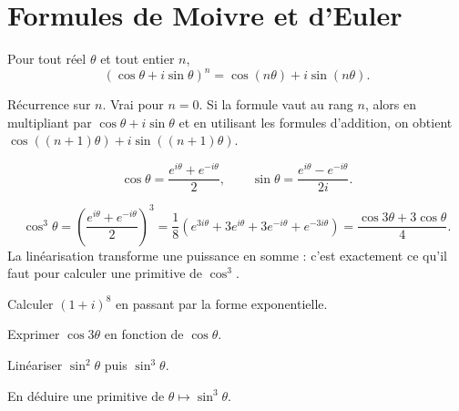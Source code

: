 \section{Formules de Moivre et d'Euler}

\begin{theoreme}
Pour tout réel $\theta$ et tout entier $n$,
\[
  \left(\cos\theta+i\sin\theta\right)^{n} = \cos(n\theta)+i\sin(n\theta).
\]
\end{theoreme}

\begin{demonstration}
Récurrence sur $n$. Vrai pour $n = 0$. Si la formule vaut au rang $n$, alors
en multipliant par $\cos\theta+i\sin\theta$ et en utilisant les formules
d'addition, on obtient $\cos((n+1)\theta)+i\sin((n+1)\theta)$.
\end{demonstration}

\begin{theoreme}
\[
  \cos\theta = \frac{e^{i\theta}+e^{-i\theta}}{2},
  \qquad
  \sin\theta = \frac{e^{i\theta}-e^{-i\theta}}{2i}.
\]
\end{theoreme}

\begin{exemple}
\[
  \cos^{3}\theta
  = \left(\frac{e^{i\theta}+e^{-i\theta}}{2}\right)^{3}
  = \frac18\left(e^{3i\theta}+3e^{i\theta}+3e^{-i\theta}+e^{-3i\theta}\right)
  = \frac{\cos3\theta+3\cos\theta}{4}.
\]
La linéarisation transforme une puissance en somme : c'est exactement ce
qu'il faut pour calculer une primitive de $\cos^{3}$.
\end{exemple}

\begin{entrainement}
\exo[\niveau{1}] Calculer $(1+i)^{8}$ en passant par la forme exponentielle.

\exo[\niveau{2}] Exprimer $\cos3\theta$ en fonction de $\cos\theta$.

\exo[\niveau{2}] Linéariser $\sin^{2}\theta$ puis $\sin^{3}\theta$.

\exo[\niveau{3}] En déduire une primitive de $\theta \mapsto \sin^{3}\theta$.
\end{entrainement}

